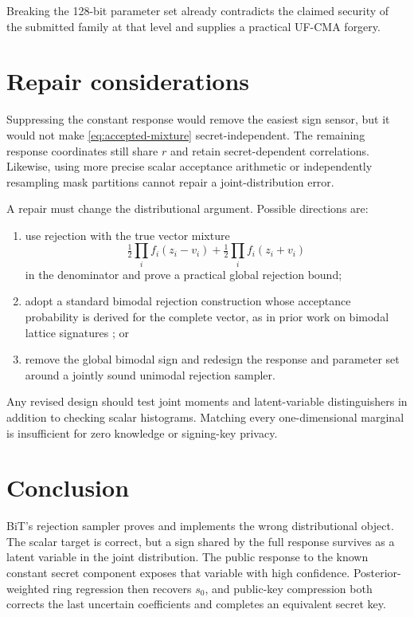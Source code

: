 \documentclass[11pt,a4paper]{article}
\begin{document}
Breaking the 128-bit parameter set already contradicts the claimed security
of the submitted family at that level and supplies a practical UF-CMA forgery.

\section{Repair considerations}

Suppressing the constant response would remove the easiest sign sensor, but it
would not make \eqref{eq:accepted-mixture} secret-independent.  The remaining
response coordinates still share $r$ and retain secret-dependent correlations.
Likewise, using more precise scalar acceptance arithmetic or independently
resampling mask partitions cannot repair a joint-distribution error.

A repair must change the distributional argument.  Possible directions are:

\begin{enumerate}[leftmargin=1.7em]
  \item use rejection with the true vector mixture
  \[
   \tfrac12\prod_i f_i(z_i-v_i)+
   \tfrac12\prod_i f_i(z_i+v_i)
  \]
  in the denominator and prove a practical global rejection bound;
  \item adopt a standard bimodal rejection construction whose acceptance
        probability is derived for the complete vector, as in prior work on
        bimodal lattice signatures \cite{DDLL}; or
  \item remove the global bimodal sign and redesign the response and parameter
        set around a jointly sound unimodal rejection sampler.
\end{enumerate}

Any revised design should test joint moments and latent-variable distinguishers
in addition to checking scalar histograms.  Matching every one-dimensional
marginal is insufficient for zero knowledge or signing-key privacy.

\section{Conclusion}

BiT's rejection sampler proves and implements the wrong distributional object.
The scalar target is correct, but a sign shared by the full response survives
as a latent variable in the joint distribution.  The public response to the
known constant secret component exposes that variable with high confidence.
Posterior-weighted ring regression then recovers $s_0$, and public-key
compression both corrects the last uncertain coefficients and completes an
equivalent secret key.
\end{document}
